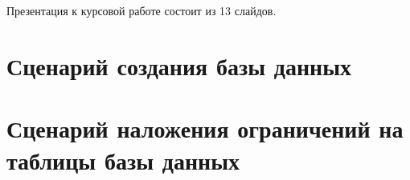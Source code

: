 \begin{appendices}

\chapter{}

Презентация к курсовой работе состоит из 13 слайдов.

\chapter{Сценарий создания базы данных}



\newpage



\newpage



\chapter{Сценарий наложения ограничений на таблицы базы данных}



\newpage



\newpage



\newpage



\end{appendices}